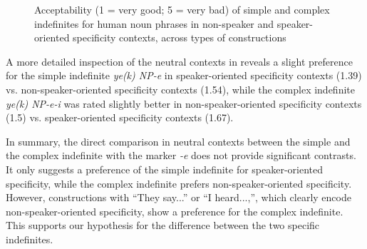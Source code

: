 \documentclass[output=paper]{langsci/langscibook}
\begin{document}
\begin{figure}

\dataset
{}

\caption{Acceptability (1 = very good; 5 = very bad) of simple and complex indefinites for human noun phrases in non-speaker and speaker-oriented specificity contexts, across types of constructions}\label{4fig:3}
\end{figure}

A more detailed inspection of the neutral contexts in  reveals a slight preference for the simple indefinite {\emph{ye(k) NP-e}} in speaker-oriented specificity contexts (1.39) vs. non-speaker-oriented specificity contexts (1.54), while the complex indefinite {\emph{ye(k) NP-e-i}} was rated slightly better in non-speaker-oriented specificity contexts (1.5) vs. speaker-oriented specificity contexts (1.67).

{
In summary, the direct comparison in neutral contexts between the simple and the complex indefinite with the marker {\emph{-e}} does not provide significant contrasts. It only suggests a preference of the simple indefinite for speaker-oriented specificity, while the complex indefinite prefers non-speaker-oriented specificity. However, constructions with ``They say...'' or ``I heard...,'', which clearly encode non-speaker-oriented specificity, show a preference for the complex indefinite. This supports our hypothesis for the difference between the two specific indefinites.
}
\end{document}
